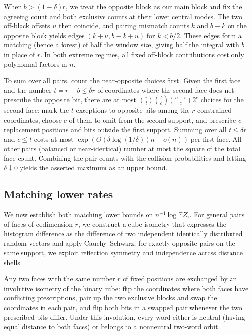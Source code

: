 When $b>(1-\delta)r$, we treat the opposite block as our main block and fix the agreeing count and both exclusive counts at their lower central modes. The two off-block offsets $u$ then coincide, and pairing mismatch counts $k$ and $b-k$ on the opposite block yields edges $(k+u,b-k+u)$ for $k<b/2$. These edges form a matching (hence a forest) of half the window size, giving half the integral with $b$ in place of $r$. In both extreme regimes, all fixed off-block contributions cost only polynomial factors in $n$.

To sum over all pairs, count the near-opposite choices first. Given the first face and the number $t=r-b\le\delta r$ of coordinates where the second face does not prescribe the opposite bit, there are at most $\binom rt\binom tc\binom{n-r}c2^c$ choices for the second face: mark the $t$ exceptions to opposite bits among the $r$ constrained coordinates, choose $c$ of them to omit from the second support, and prescribe $c$ replacement positions and bits outside the first support. Summing over all $t\le\delta r$ and $c\le t$ costs at most $\exp(O(\delta\log(1/\delta))n+o(n))$ per first face. All other pairs (balanced or near-identical) number at most the square of the total face count. Combining the pair counts with the collision probabilities and letting $\delta\downarrow0$ yields the asserted maximum as an upper bound.

\subsection{Matching lower rates}
We now establish both matching lower bounds on $n^{-1}\log\mathbb E Z_r$. For general pairs of faces of codimension $r$, we construct a cube isometry that expresses the histogram difference as the difference of two independent identically distributed random vectors and apply Cauchy--Schwarz; for exactly opposite pairs on the same support, we exploit reflection symmetry and independence across distance shells.

Any two faces with the same number $r$ of fixed positions are exchanged by an involutive isometry of the binary cube: flip the coordinates where both faces have conflicting prescriptions, pair up the two exclusive blocks and swap the coordinates in each pair, and flip both bits in a swapped pair whenever the two prescribed bits differ. Under this involution, every word either is neutral (having equal distance to both faces) or belongs to a nonneutral two-word orbit.

